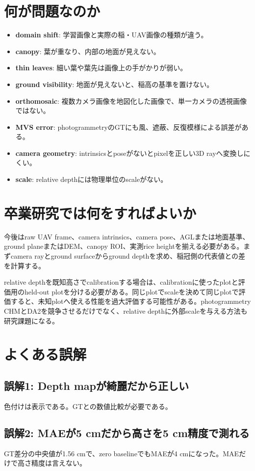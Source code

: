 \documentclass[a4paper,11pt]{ltjsarticle}
\begin{document}
\section{何が問題なのか}
\begin{itemize}
\item \textbf{domain shift}: 学習画像と実際の稲・UAV画像の種類が違う。
\item \textbf{canopy}: 葉が重なり、内部の地面が見えない。
\item \textbf{thin leaves}: 細い葉や葉先は画像上の手がかりが弱い。
\item \textbf{ground visibility}: 地面が見えないと、稲高の基準を置けない。
\item \textbf{orthomosaic}: 複数カメラ画像を地図化した画像で、単一カメラの透視画像ではない。
\item \textbf{MVS error}: photogrammetryのGTにも風、遮蔽、反復模様による誤差がある。
\item \textbf{camera geometry}: intrinsicsとposeがないとpixelを正しい3D rayへ変換しにくい。
\item \textbf{scale}: relative depthには物理単位のscaleがない。
\end{itemize}

\section{卒業研究では何をすればよいか}
今後はraw UAV frame、camera intrinsics、camera pose、AGLまたは地面基準、ground planeまたはDEM、canopy ROI、実測rice heightを揃える必要がある。まずcamera rayとground surfaceからground depthを求め、稲冠側の代表値との差を計算する。

relative depthを既知高さでcalibrationする場合は、calibrationに使ったplotと評価用のheld-out plotを分ける必要がある。同じplotでscaleを決めて同じplotで評価すると、未知plotへ使える性能を過大評価する可能性がある。photogrammetry CHMとDA2を競争させるだけでなく、relative depthに外部scaleを与える方法も研究課題になる。

\section{よくある誤解}
\subsection{誤解1: Depth mapが綺麗だから正しい}
色付けは表示である。GTとの数値比較が必要である。
\subsection{誤解2: MAEが5 cmだから高さを5 cm精度で測れる}
GT差分の中央値が1.56 cmで、zero baselineでもMAEが4 cmになった。MAEだけで高さ精度は言えない。
\end{document}
